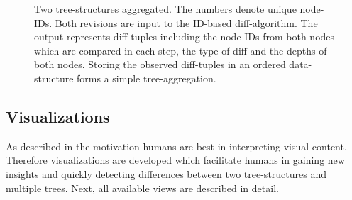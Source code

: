 \begin{figure}[tb]
\caption{\label{fig:aggregation} Two tree-structures aggregated. The numbers denote unique node-IDs. Both revisions are input to the ID-based diff-algorithm. The output represents diff-tuples including the node-IDs from both nodes which are compared in each step, the type of diff and the depths of both nodes. Storing the observed diff-tuples in an ordered data-structure forms a simple tree-aggregation.}
\end{figure} 

\subsection{Visualizations}
As described in the motivation humans are best in interpreting visual content. Therefore visualizations are developed which facilitate humans in gaining new insights and quickly detecting differences between two tree-structures and multiple trees. Next, all available views are described in detail. %

